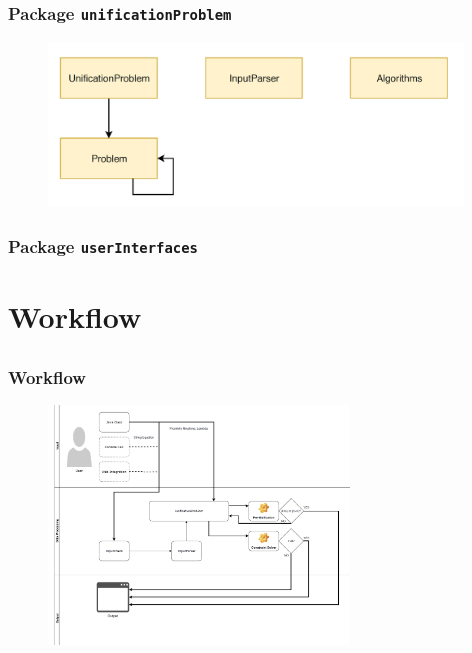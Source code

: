 
	\begin{frame}[fragile=singleslide]
	\frametitle{Package \texttt{unificationProblem}}
	 
	\begin{figure}
		\centering
			\includegraphics[width=11cm]{Bilder/unificationProblem.PNG}
		\label{fig:elements}
	\end{figure}
	
  \end{frame}	
	
	
	\begin{frame}[fragile=singleslide]
	\frametitle{Package \texttt{userInterfaces}}
	 

	
  \end{frame}

	\section{Workflow} \subsection{}
	
		\begin{frame}[fragile=singleslide]
		\frametitle{Workflow}
		
		\begin{figure}
			\centering
				\includegraphics[width=8cm]{Bilder/WorkFlow.PNG}
			\label{fig:WorkFlow}
		\end{figure}
		
		\end{frame}

